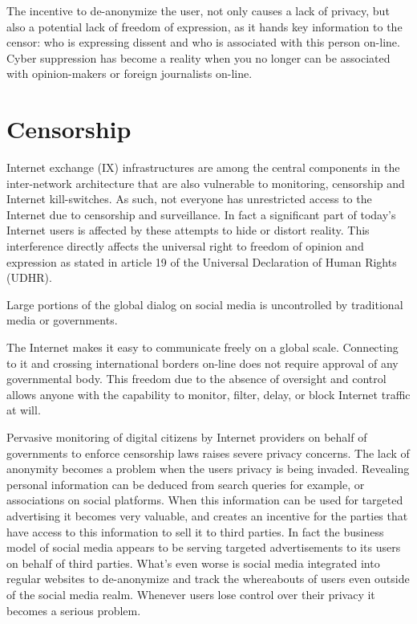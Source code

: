 The incentive to de-anonymize the user, not only causes a lack of privacy, but also a potential lack of freedom of expression, as it hands key information to the censor: who is expressing dissent and who is associated with this person on-line.
Cyber suppression has become a reality when you no longer can be associated with opinion-makers or foreign journalists on-line.


\section{Censorship}
Internet exchange (IX) infrastructures are among the central components in the inter-network architecture that are also vulnerable to monitoring, censorship and Internet kill-switches.
As such, not everyone has unrestricted access to the Internet due to censorship and surveillance.
In fact a significant part of today's Internet users is affected by these attempts to hide or distort reality. %
This interference directly affects the universal right to freedom of opinion and expression as stated in article 19 of the Universal Declaration of Human Rights (UDHR).

Large portions of the global dialog on social media is uncontrolled by traditional media or governments.


The Internet makes it easy to communicate freely on a global scale.
Connecting to it and crossing international borders on-line does not require approval of any governmental body. %
This freedom due to the absence of oversight and control allows anyone with the capability to monitor, filter, delay, or block Internet traffic at will.



Pervasive monitoring of digital citizens by Internet providers on behalf of governments to enforce censorship laws raises severe privacy concerns.
The lack of anonymity becomes a problem when the users privacy is being invaded.
Revealing personal information can be deduced from search queries for example, or associations on social platforms.
When this information can be used for targeted advertising it becomes very valuable, and creates an incentive for the parties that have access to this information to sell it to third parties.
In fact the business model of social media appears to be serving targeted advertisements to its users on behalf of third parties.
What's even worse is social media integrated into regular websites to de-anonymize and track the whereabouts of users even outside of the social media realm.
Whenever users lose control over their privacy it becomes a serious problem.

